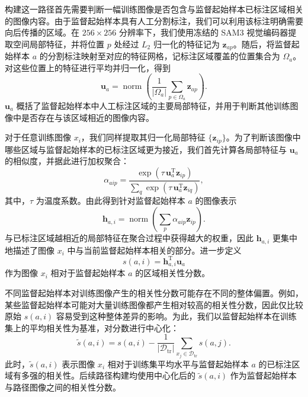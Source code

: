 \documentclass[UTF8,a4paper,10pt,twocolumn]{ctexart}
\begin{document}
构建这一路径首先需要判断一幅训练图像是否包含与监督起始样本已标注区域相关的图像内容。由于监督起始样本具有人工分割标注，我们可以利用该标注明确需要向后传播的区域。在 $256\times256$ 分辨率下，我们使用冻结的 SAM3 视觉编码器提取空间局部特征，并将位置 $p$ 处经过 $L_2$ 归一化的特征记为 $\mathbf{z}_{ap}$。随后，将监督起始样本 $a$ 的分割标注映射至对应的特征网格，记标注区域覆盖的位置集合为 $\Omega_a$。对这些位置上的特征进行平均并归一化，得到
\begin{equation}
\mathbf{u}_a
=
\operatorname{norm}
\left(
\frac{1}{|\Omega_a|}
\sum_{p\in\Omega_a}
\mathbf{z}_{ap}
\right).
\end{equation}
$\mathbf{u}_a$ 概括了监督起始样本中人工标注区域的主要局部特征，并用于判断其他训练图像中是否存在与该区域相近的图像内容。

对于任意训练图像 $x_i$，我们同样提取其归一化局部特征 $\{\mathbf{z}_{ip}\}$。为了判断该图像中哪些区域与监督起始样本的已标注区域更为接近，我们首先计算各局部特征与 $\mathbf{u}_a$ 的相似度，并据此进行加权聚合：
\begin{equation}
\alpha_{aip}
=
\frac{
\exp\left(\tau\,\mathbf{u}_a^{\mathrm T}\mathbf{z}_{ip}\right)
}{
\sum_q
\exp\left(\tau\,\mathbf{u}_a^{\mathrm T}\mathbf{z}_{iq}\right)
},
\end{equation}
其中，$\tau$ 为温度系数。由此得到针对监督起始样本 $a$ 的图像表示
\begin{equation}
\mathbf{h}_{a,i}
=
\operatorname{norm}
\left(
\sum_p
\alpha_{aip}\mathbf{z}_{ip}
\right).
\end{equation}
与已标注区域越相近的局部特征在聚合过程中获得越大的权重，因此 $\mathbf{h}_{a,i}$ 更集中地描述了图像 $x_i$ 中与当前监督起始样本相关的部分。进一步定义
\begin{equation}
s(a,i)
=
\mathbf{h}_{a,i}^{\mathrm T}\mathbf{u}_a
\end{equation}
作为图像 $x_i$ 相对于监督起始样本 $a$ 的区域相关性分数。

不同监督起始样本对训练图像产生的相关性分数可能存在不同的整体偏置。例如，某些监督起始样本可能对大量训练图像都产生相对较高的相关性分数，因此仅比较原始 $s(a,i)$ 容易受到这种整体差异的影响。为此，我们以监督起始样本在训练集上的平均相关性为基准，对分数进行中心化：
\begin{equation}
\widetilde{s}(a,i)
=
s(a,i)
-
\frac{1}{|\mathcal{D}_{\mathrm{tr}}|}
\sum_{x_j\in\mathcal{D}_{\mathrm{tr}}}
s(a,j).
\end{equation}
此时，$\widetilde{s}(a,i)$ 表示图像 $x_i$ 相对于训练集平均水平与监督起始样本 $a$ 的已标注区域有多强的相关性。后续路径构建均使用中心化后的 $\widetilde{s}(a,i)$ 作为监督起始样本与路径图像之间的相关性分数。
\end{document}
